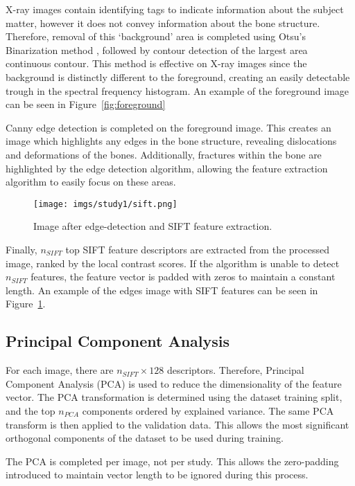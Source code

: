 \documentclass{IEEEtran}
\newcommand{\nsift}{\ensuremath{n_{SIFT}}}
\newcommand{\npca}{\ensuremath{n_{PCA}}}
\begin{document}
	X-ray images contain identifying tags to indicate information about the subject matter, however it does not convey information about the bone structure. Therefore, removal of this `background' area is completed using Otsu's Binarization method \cite{otsu1979threshold}, followed by contour detection of the largest area continuous contour. This method is effective on X-ray images since the background is distinctly different to the foreground, creating an easily detectable trough in the spectral frequency histogram. An example of the foreground image can be seen in Figure~\ref{fig:foreground}
	
	Canny edge detection is completed on the foreground image. This creates an image which highlights any edges in the bone structure, revealing dislocations and deformations of the bones. Additionally, fractures within the bone are highlighted by the edge detection algorithm, allowing the feature extraction algorithm to easily focus on these areas.
	
	\begin{figure}[t!]
		\centering
		\texttt{[image: imgs/study1/sift.png]}
		\caption{Image after edge-detection and SIFT feature extraction.}
		\label{fig:sift}
	\end{figure}
	
	Finally, $\nsift$ top SIFT feature descriptors are extracted from the processed image, ranked by the local contrast scores. If the algorithm is unable to detect $\nsift$ features, the feature vector is padded with zeros to maintain a constant length. An example of the edges image with SIFT features can be seen in Figure~\ref{fig:sift}.
	
	\subsection{Principal Component Analysis}
	
	For each image, there are $\nsift \times 128$ descriptors. Therefore, Principal Component Analysis (PCA) is used to reduce the dimensionality of the feature vector. The PCA transformation is determined using the dataset training split, and the top $\npca$ components ordered by explained variance. The same PCA transform is then applied to the validation data. This allows the most significant orthogonal components of the dataset to be used during training.
	
	The PCA is completed per image, not per study. This allows the zero-padding introduced to maintain vector length to be ignored during this process.
		
\end{document}
